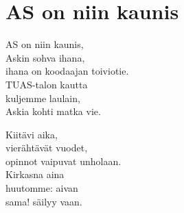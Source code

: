 \section{AS on niin kaunis}
AS on niin kaunis,\\
Askin sohva ihana,\\
ihana on koodaajan toiviotie.\\
TUAS-talon kautta\\
kuljemme laulain,\\
Askia kohti matka vie.

Kiitävi aika,\\
vierähtävät vuodet,\\
opinnot vaipuvat unholaan.\\
Kirkasna aina\\
huutomme: aivan\\
sama! säilyy vaan.
